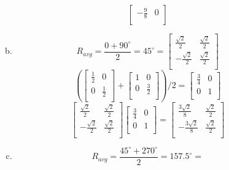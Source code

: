 \documentclass[11pt, oneside]{article}
\begin{document}
\begin{enumerate}[Problem 1:]
\begin{enumerate}[1.]
\begin{enumerate}[a)]
\[\begin{bmatrix}
              -\frac 9 8 & 0\\
            \end{bmatrix}
          \]
        \item
          \[
            R_{avg} = \frac {0 + 90^\circ} 2 = 45^\circ = 
            \begin{bmatrix}
              \frac {\sqrt 2} 2 & \frac {\sqrt 2} 2\\
              -\frac {\sqrt 2} 2 & \frac {\sqrt 2} 2\\
            \end{bmatrix}
          \]
          \[
            \left(
              \begin{bmatrix}
                \frac 1 2 & 0\\
                0 & \frac 1 2\\
              \end{bmatrix}
              +
              \begin{bmatrix}
                1 & 0\\
                0 & \frac 3 2\\
              \end{bmatrix}
            \right)
            \Big/ 2
            =
            \begin{bmatrix}
              \frac 3 4 & 0\\
              0 & 1\\
            \end{bmatrix}
          \]
          \[
            \begin{bmatrix}
              \frac {\sqrt 2} 2 & \frac {\sqrt 2} 2\\
              -\frac {\sqrt 2} 2 & \frac {\sqrt 2} 2\\
            \end{bmatrix}
            \begin{bmatrix}
              \frac 3 4 & 0\\
              0 & 1\\
            \end{bmatrix}
            =
            \begin{bmatrix}
              \frac {3\sqrt 2} 8 & \frac {\sqrt 2} 2\\
              -\frac {3\sqrt 2} 8 & \frac {\sqrt 2} 2\\
            \end{bmatrix}
          \]
        \item
          \[
            R_{avg} = \frac {45^\circ + 270^\circ} 2 = 157.5^\circ = 
\]
\end{enumerate}
\end{enumerate}
\end{enumerate}
\end{document}

